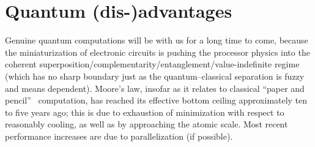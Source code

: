 \documentclass[runningheads]{llncs}
\begin{document}
%
%
%
%
%
%
%
%
%
%
%
%
%
%
%
%
%
%



\section{Quantum (dis-)advantages}

Genuine quantum computations will be with us for a long time to come,
because the miniaturization of electronic circuits is pushing the processor physics into the coherent superposition/complementarity/entanglement/value-indefinite regime
(which has no sharp boundary just as the quantum--classical separation is fuzzy and means dependent).
Moore's law, insofar as it relates to classical ``paper and pencil''~\cite[p.~34]{Turing-Intelligent_Machinery} computation,
has reached its effective bottom ceiling approximately ten to five years ago; this is due to exhaustion of minimization
with respect to reasonably cooling, as well as by approaching the atomic scale.
Most recent performance increases are due to parallelization (if possible).
\end{document}
